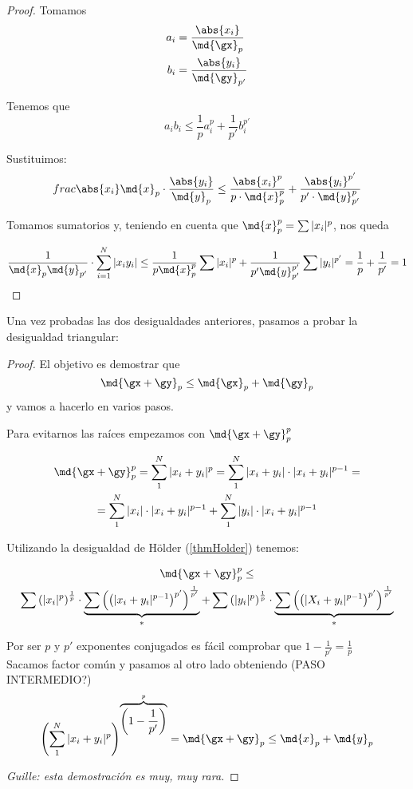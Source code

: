 \documentclass{apuntes}
\begin{document}
\begin{proof} Tomamos  
 \begin{align*}
 a_i &= \frac{\abs{x_i}}{\md{\gx}_p} \\
 b_i &= \frac{\abs{y_i}}{\md{\gy}_{p'}}
 \end{align*}
 
 Tenemos que \[ a_i b_i \leq \frac{1}{p}a_i ^ p + \frac{1}{p'} b_i^{p'} \]
 
 Sustituimos: 
 \[  frac{\abs{x_i}}{\md{x}_{p}} \cdot \frac{\abs{y_i}}{\md{y}_{p}} \leq \frac{\abs{x_i}^p}{p\cdot \md{x}_{p}^p} + \frac{\abs{y_i}^{p'}}{p'\cdot\md{y}_{p'}^{p}} \]
 
 Tomamos sumatorios y, teniendo en cuenta que $\md{x}_{p}^p = \sum|x_i|^p$, nos queda 
 
 \[ \frac{1}{\md{x}_{p}\md{y}_{p'}}\cdot \sum_{i=1}^N |x_iy_i| \leq \frac{1}{p\md{x}_{p}^p} \sum |x_i|^p + \frac{1}{p'\md{y}_{p'}^{p'}} \sum |y_i|^{p'} = \frac{1}{p} + \frac{1}{p'} = 1 \]
 
 \end{proof}
 
Una vez probadas las dos desigualdades anteriores, pasamos a probar la desigualdad triangular: 
 
\begin{proof} El objetivo es demostrar que \[ \md{\gx+\gy}_p \leq \md{\gx}_p+\md{\gy}_p \] y vamos a hacerlo en varios pasos.
 
 Para evitarnos las raíces empezamos con $\md{\gx+\gy}_p^p$

 \begin{gather*}
 \md{\gx+\gy}_p ^ p = \sum_1 ^ N |x_i+y_i| ^ p = \sum_ 1 ^ N |x_i+y_i| \cdot |x_i+y_i| ^ {p-1} =\\
 = \sum_1 ^ N |x_i|\cdot|x_i+y_i| ^ {p-1} + \sum_1^N |y_i| \cdot |x_i+y_i|^{p-1}
 \end{gather*}

 Utilizando la desigualdad de Hölder (\ref{thmHolder}) tenemos:
 
 \begin{multline*} \md{\gx+\gy}_p ^ p \leq \\
 \sum \left(|x_i|^p\right)^{\frac{1}{p}} \cdot \underbrace{\sum \left(\left(|x_i+y_i|^{p-1}\right)^{p'}\right)^{\frac{1}{p'}}}_* +
 \sum \left(|y_i|^p\right)^{\frac{1}{p}} \cdot \underbrace{\sum \left(\left(|X_i+y_i|^{p-1}\right)^{p'}\right)^{\frac{1}{p'}}}_* 
 \end{multline*}
 
 Por ser $p$ y $p'$ exponentes conjugados es fácil comprobar que $1-\frac{1}{p'} = \frac{1}{p}$\\
 Sacamos factor común y pasamos al otro lado obteniendo (PASO INTERMEDIO?)
\[ \left(\sum_1^N |x_i+y_i|^p\right)^{\overbrace{\left(1-\frac{1}{p'}\right)}^p} = \md{\gx+\gy}_p \leq \md{x}_{p} + \md{y}_{p} \]

\textit{Guille: esta demostración es muy, muy rara.}
\end{proof}
\end{document}
